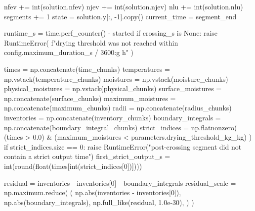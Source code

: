 \documentclass[withoutpreface,bwprint]{cumcmthesis}
\begin{document}
\begin{PythonCode}
        nfev += int(solution.nfev)
        njev += int(solution.njev)
        nlu += int(solution.nlu)
        segments += 1
        state = solution.y[:, -1].copy()
        current_time = segment_end

    runtime_s = time.perf_counter() - started
    if crossing_s is None:
        raise RuntimeError(
            f"drying threshold was not reached within {config.maximum_duration_s / 3600:g} h"
        )

    times = np.concatenate(time_chunks)
    temperatures = np.vstack(temperature_chunks)
    moistures = np.vstack(moisture_chunks)
    physical_moistures = np.vstack(physical_chunks)
    surface_moistures = np.concatenate(surface_chunks)
    maximum_moistures = np.concatenate(maximum_chunks)
    radii = np.concatenate(radius_chunks)
    inventories = np.concatenate(inventory_chunks)
    boundary_integrals = np.concatenate(boundary_integral_chunks)
    strict_indices = np.flatnonzero(
        (times > 0.0)
        & (maximum_moistures < parameters.drying_threshold_kg_kg)
    )
    if strict_indices.size == 0:
        raise RuntimeError("post-crossing segment did not contain a strict output time")
    first_strict_output_s = int(round(float(times[int(strict_indices[0])])))

    residual = inventories - inventories[0] - boundary_integrals
    residual_scale = np.maximum.reduce(
        (
            np.abs(inventories - inventories[0]),
            np.abs(boundary_integrals),
            np.full_like(residual, 1.0e-30),
        )
    )


\end{PythonCode}
\end{document}
